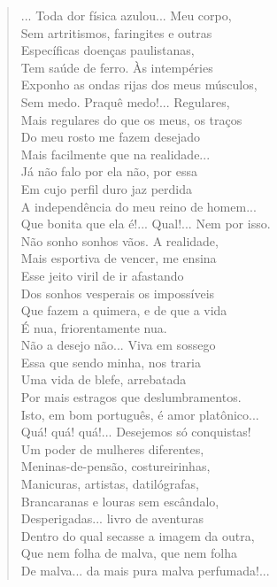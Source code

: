 \begin{verse}
... Toda dor física azulou... Meu corpo,\\
Sem artritismos, faringites e outras\\
Específicas doenças paulistanas,\\
Tem saúde de ferro. Às intempéries\\
Exponho as ondas rijas dos meus músculos,\\
Sem medo. Praquê medo!... Regulares,\\
Mais regulares do que os meus, os traços\\
Do meu rosto me fazem desejado\\
Mais facilmente que na realidade...\\
Já não falo por ela não, por essa\\
Em cujo perfil duro jaz perdida\\
A independência do meu reino de homem...\\
Que bonita que ela é!... Qual!... Nem por isso.\\
Não sonho sonhos vãos. A realidade,\\
Mais esportiva de vencer, me ensina\\
Esse jeito viril de ir afastando\\
Dos sonhos vesperais os impossíveis\\
Que fazem a quimera, e de que a vida\\
É nua, friorentamente nua.\\
Não a desejo não... Viva em sossego\\
Essa que sendo minha, nos traria\\
Uma vida de blefe, arrebatada\\
Por mais estragos que deslumbramentos.\\
Isto, em bom português, é amor platônico...\\
Quá! quá! quá!... Desejemos só conquistas!\\
Um poder de mulheres diferentes,\\
Meninas-de-pensão, costureirinhas,\\
Manicuras, artistas, datilógrafas,\\
Brancaranas e louras sem escândalo,\\
Desperigadas... livro de aventuras\\
Dentro do qual secasse a imagem da outra,\\
Que nem folha de malva, que nem folha\\
De malva... da mais pura malva perfumada!...


\end{verse}
